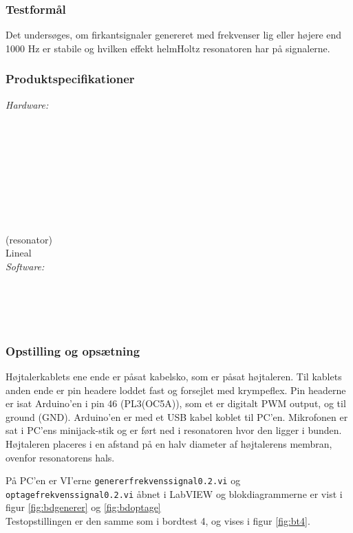 		\subsubsection{Testformål}
		Det undersøges, om firkantsignaler genereret med frekvenser lig eller højere end 1000 Hz er stabile og hvilken effekt helmHoltz resonatoren har på signalerne. 
		
		\subsubsection{Produktspecifikationer}
		
		\textit{Hardware:}\\
		\tores\\
		\\
		\kabelsko\\
		\pins\\
		\krympeflex\\
		\arduino\\
		\mikrofon\\
		\PC\\
		\usbkabel\\
		 (resonator)\\
		Lineal\\
	
		\textit{Software:}\\
		\labview\\
		\visa\\
		\vi\\
		\ardsw\\
		
		
		\subsubsection{Opstilling og opsætning}
		
		Højtalerkablets ene ende er påsat kabelsko, som er påsat højtaleren. Til kablets anden ende er pin headere loddet fast og forsejlet med krympeflex. Pin headerne er isat Arduino'en i pin 46 (PL3(OC5A)), som et er digitalt PWM output, og til ground (GND). 
		Arduino'en er med et USB kabel koblet til PC'en.	
		Mikrofonen er sat i PC'ens minijack-stik og er ført ned i resonatoren hvor den ligger i bunden. Højtaleren placeres i en afstand på en halv diameter af højtalerens membran, ovenfor resonatorens hals. 
		
		På PC'en er VI'erne \texttt{genererfrekvenssignal0.2.vi} og \texttt{optagefrekvenssignal0.2.vi} åbnet i LabVIEW og blokdiagrammerne er vist i figur \ref{fig:bdgenerer} og \ref{fig:bdoptage} \\ Testopstillingen er den samme som i bordtest 4, og vises i figur \ref{fig:bt4}.  
		

